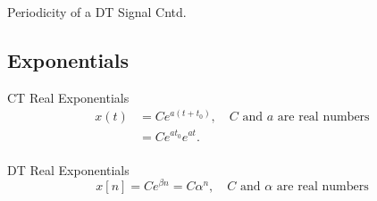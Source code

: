 \begin{frame}{Periodicity of a DT Signal Cntd.}
    \centering
    
    
    
    
\end{frame}

\subsection{Exponentials}

\begin{frame}[plain]{CT Real Exponentials}
    \begin{equation*}
        \begin{split}
            x(t) &= Ce^{a(t+t_0)}, \quad C \text{ and } a \text{ are real numbers}\\
            &=   Ce^{at_0}e^{at}.\\
        \end{split}
    \end{equation*}
    {
        {
            \centering
            
        }
    }
\end{frame}

\begin{frame}[plain]{DT Real Exponentials}
    \begin{equation*}
        x[n] = Ce^{\beta n} = C\alpha^n, \quad C \text{ and } \alpha \text{ are real numbers}
    \end{equation*}
\end{frame}

\begin{frame}[plain]
    {
        {
            \centering
            
        }
    }
\end{frame}

\begin{frame}[plain]
    {
        {
            \centering
            
        }
    }
\end{frame}


